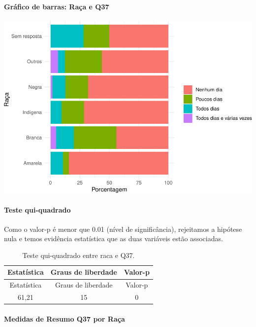 \documentclass[]{article}
\let\oldparagraph\paragraph
\renewcommand{\paragraph}[1]{\oldparagraph{#1}\mbox{}}
\begin{document}
\hypertarget{gruxe1fico-de-barras-rauxe7a-e-q37}{%
\paragraph{Gráfico de barras: Raça e Q37}\label{gruxe1fico-de-barras-rauxe7a-e-q37}}

\begin{center}\includegraphics[width=0.75\linewidth]{relatorio_covid19_files/figure-latex/unnamed-chunk-1401-1} \end{center}

\hypertarget{teste-qui-quadrado-120}{%
\paragraph{Teste qui-quadrado}\label{teste-qui-quadrado-120}}

Como o valor-p é menor que 0.01 (nível de significância), rejeitamos a hipótese nula e temos evidência estatística que as duas variáveis estão associadas.

\begin{longtable}[]{@{}ccc@{}}
\caption{\label{tab:unnamed-chunk-1403}Teste qui-quadrado entre raca e Q37.}\tabularnewline
\toprule
Estatística & Graus de liberdade & Valor-p\tabularnewline
\midrule
\endfirsthead
\toprule
Estatística & Graus de liberdade & Valor-p\tabularnewline
\midrule
\endhead
61,21 & 15 & 0\tabularnewline
\bottomrule
\end{longtable}

\cleardoublepage

\hypertarget{medidas-de-resumo-q37-por-rauxe7a}{%
\paragraph{Medidas de Resumo Q37 por Raça}\label{medidas-de-resumo-q37-por-rauxe7a}}
\end{document}
